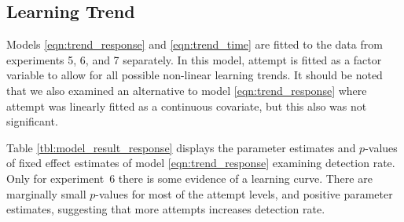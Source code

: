 \documentclass[10pt]{article}\usepackage[]{graphicx}\usepackage[]{color}
\begin{document}
%
%


\subsection{Learning Trend} Models \eqref{eqn:trend_response} and \eqref{eqn:trend_time} are fitted to the data from experiments 5, 6, and 7 separately. In this model, attempt is fitted as a factor variable to allow for all possible non-linear learning trends.  It should be noted that we also examined an alternative to model \eqref{eqn:trend_response} where attempt was linearly fitted as a continuous covariate, but this also was not significant.

Table \ref{tbl:model_result_response} displays the parameter estimates and $p$-values of fixed effect estimates of model \eqref{eqn:trend_response} examining detection rate. Only for experiment~6 there is some evidence of a learning curve. There are marginally small $p$-values for most of the attempt levels, and positive parameter estimates, suggesting that more attempts increases detection rate. 
\end{document}
